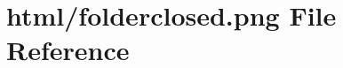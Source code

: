 \hypertarget{folderclosed_8png}{}\section{html/folderclosed.png File Reference}
\label{folderclosed_8png}
